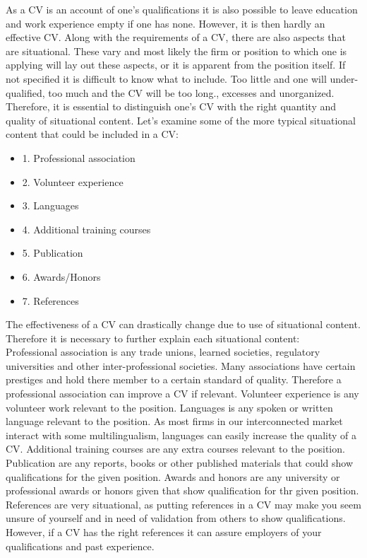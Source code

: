 As a CV is an account of one’s qualifications it is also possible to leave education and work experience empty if one has none.
However, it is then hardly an effective CV.\cite{Difference_between_resume_and_curriculum_Vitae}
Along with the requirements of a CV, there are also aspects that are situational.
These vary and most likely the firm or position to which one is applying will lay out these aspects, or it is apparent from the position itself.
If not specified it is difficult to know what to include. Too little and one will under-qualified, too much and the CV will be too long.\cite{Job_Application_for_science}, excesses and unorganized.
Therefore, it is essential to distinguish one’s CV with the right quantity and quality of situational content.
Let's examine some of the more typical situational content that could be included in a CV: \\
\begin{itemize}
   \item 1. Professional association
   \item 2. Volunteer experience
   \item 3. Languages
   \item 4. Additional training courses
   \item 5. Publication
   \item 6. Awards/Honors
   \item 7. References\cite{6_sections} \\
\end{itemize}
The effectiveness of a CV can drastically change due to use of situational content.
Therefore it is necessary to further explain each situational content: \\
Professional association is any trade unions, learned societies, regulatory universities and other inter-professional societies.
Many associations have certain prestiges and hold there member to a certain standard of quality.
Therefore a professional association can improve a CV if relevant.\cite{Professional_associations_and_organizations}\cite{Perks_of_professional_organizations}
Volunteer experience is any volunteer work relevant to the position.
Languages is any spoken or written language relevant to the position.
As most firms in our interconnected market interact with some multilingualism, languages can easily increase the quality of a CV.
Additional training courses are any extra courses relevant to the position. 
Publication are any reports, books or other published materials that could show qualifications for the given position.
Awards and honors are any university or professional awards or honors given that show qualification for thr given position.
References are very situational, as putting references in a CV may make you seem unsure of yourself and in need of validation from others to show qualifications.
However, if a CV has the right references it can assure employers of your qualifications and past experience. \\

